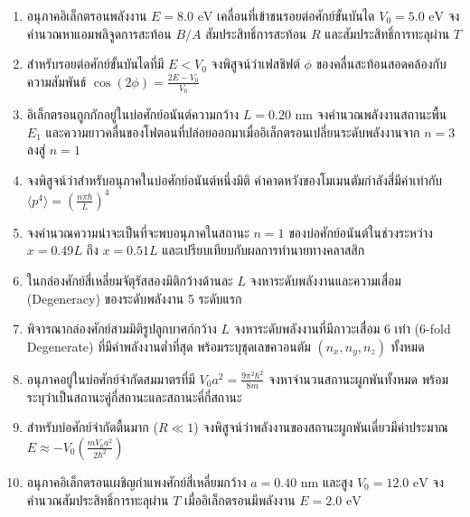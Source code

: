 \begin{enumerate}
    \item อนุภาคอิเล็กตรอนพลังงาน $E = 8.0\text{ eV}$ เคลื่อนที่เข้าชนรอยต่อศักย์ขั้นบันได $V_0 = 5.0\text{ eV}$ จงคำนวณหาแอมพลิจูดการสะท้อน $B/A$ สัมประสิทธิ์การสะท้อน $R$ และสัมประสิทธิ์การทะลุผ่าน $T$
    
    \item สำหรับรอยต่อศักย์ขั้นบันไดที่มี $E < V_0$ จงพิสูจน์ว่าเฟสชิฟต์ $\phi$ ของคลื่นสะท้อนสอดคล้องกับความสัมพันธ์ $\cos(2\phi) = \frac{2E - V_0}{V_0}$
    
    \item อิเล็กตรอนถูกกักอยู่ในบ่อศักย์อนันต์ความกว้าง $L = 0.20\text{ nm}$ จงคำนวณพลังงานสถานะพื้น $E_1$ และความยาวคลื่นของโฟตอนที่ปล่อยออกมาเมื่ออิเล็กตรอนเปลี่ยนระดับพลังงานจาก $n=3$ ลงสู่ $n=1$
    
    \item จงพิสูจน์ว่าสำหรับอนุภาคในบ่อศักย์อนันต์หนึ่งมิติ ค่าคาดหวังของโมเมนตัมกำลังสี่มีค่าเท่ากับ $\langle p^4 \rangle = \left(\frac{n\pi\hbar}{L}\right)^4$
    
    \item จงคำนวณความน่าจะเป็นที่จะพบอนุภาคในสถานะ $n=1$ ของบ่อศักย์อนันต์ในช่วงระหว่าง $x = 0.49L$ ถึง $x = 0.51L$ และเปรียบเทียบกับผลการทำนายทางคลาสสิก
    
    \item ในกล่องศักย์สี่เหลี่ยมจัตุรัสสองมิติกว้างด้านละ $L$ จงหาระดับพลังงานและความเสื่อม (Degeneracy) ของระดับพลังงาน 5 ระดับแรก
    
    \item พิจารณากล่องศักย์สามมิติรูปลูกบาศก์กว้าง $L$ จงหาระดับพลังงานที่มีภาวะเสื่อม 6 เท่า (6-fold Degenerate) ที่มีค่าพลังงานต่ำที่สุด พร้อมระบุชุดเลขควอนตัม $(n_x, n_y, n_z)$ ทั้งหมด
    
    \item อนุภาคอยู่ในบ่อศักย์จำกัดสมมาตรที่มี $V_0 a^2 = \frac{9\pi^2\hbar^2}{8m}$ จงหาจำนวนสถานะผูกพันทั้งหมด พร้อมระบุว่าเป็นสถานะคู่กี่สถานะและสถานะคี่กี่สถานะ
    
    \item สำหรับบ่อศักย์จำกัดตื้นมาก ($R \ll 1$) จงพิสูจน์ว่าพลังงานของสถานะผูกพันเดี่ยวมีค่าประมาณ $E \approx -V_0 \left(\frac{m V_0 a^2}{2\hbar^2}\right)$
    
    \item อนุภาคอิเล็กตรอนเผชิญกำแพงศักย์สี่เหลี่ยมกว้าง $a = 0.40\text{ nm}$ และสูง $V_0 = 12.0\text{ eV}$ จงคำนวณสัมประสิทธิ์การทะลุผ่าน $T$ เมื่ออิเล็กตรอนมีพลังงาน $E = 2.0\text{ eV}$
    

\end{enumerate}
